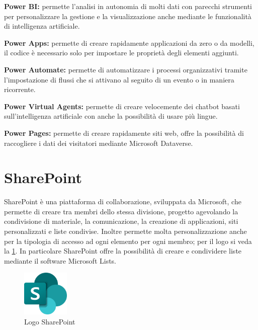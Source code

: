 \begin{description}
    \item \textbf{Power BI:} \label{tec:Power BI} permette l’analisi in autonomia di molti dati con parecchi strumenti per personalizzare la gestione e la visualizzazione anche mediante le funzionalità di intelligenza artificiale.
    \item \textbf{Power Apps:} \label{tec:Power Apps} permette di creare rapidamente applicazioni da zero o da modelli, il codice è necessario solo per impostare le proprietà degli elementi aggiunti.
    \item \textbf{Power Automate:} \label{tec:Power Automate} permette di automatizzare i processi organizzativi tramite l’impostazione di flussi che si attivano al seguito di un evento o in maniera ricorrente.
    \item \textbf{Power Virtual Agents:} permette di creare velocemente dei chatbot basati sull’intelligenza artificiale con anche la possibilità di usare più lingue.
    \item \textbf{Power Pages:} permette di creare rapidamente siti web, offre la possibilità di raccogliere i dati dei visitatori mediante Microsoft Dataverse.
\end{description}

\section{SharePoint} \label{tec:SharePoint}
SharePoint è una piattaforma di collaborazione, sviluppata da Microsoft, che permette di creare  tra membri dello stessa divisione, progetto agevolando la condivisione di materiale, la comunicazione, la creazione di applicazioni, siti personalizzati e liste condivise.
Inoltre permette molta personalizzazione anche per la tipologia di accesso ad ogni elemento per ogni membro; per il logo si veda la \figurename \space \ref*{fig:SharePoint}. 
In particolare SharePoint offre la possibilità di creare e condividere liste mediante il software Microsoft Lists.
\begin{figure}[H]
    \centering\includegraphics[width=0.2\textwidth, height=0.2\textheight,keepaspectratio]{immagini/logo-SharePoint.png}
    \caption{Logo SharePoint}
    \label{fig:SharePoint}
\end{figure}

